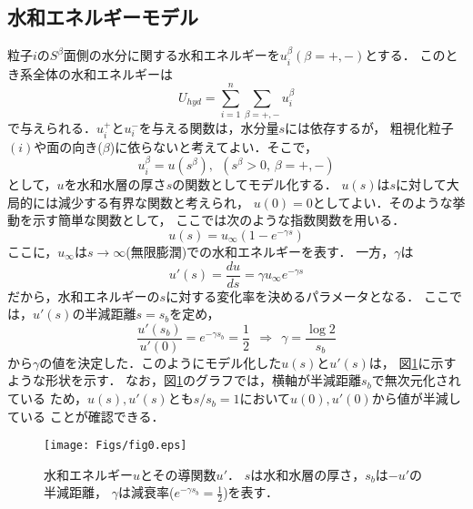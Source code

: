 \subsection{水和エネルギーモデル}
粒子$i$の$S^\beta$面側の水分に関する水和エネルギーを$u^\beta_i(\beta=+,-)$とする．
このとき系全体の水和エネルギーは
\begin{equation}
	U_{hyd}=\sum_{i=1}^n\sum_{\beta=+,-} u_i^{\beta}
	\label{eqn:}
\end{equation}
で与えられる．$u^+_i$と$u^-_i$を与える関数は，水分量$s$には依存するが，
粗視化粒子$(i)$や面の向き($\beta$)に依らないと考えてよい．そこで，
\begin{equation}
	u^\beta_i= u(s^\beta), \ \ (s^\beta>0,\, \beta=+,-)
	\label{eqn:}
\end{equation}
として，$u$を水和水層の厚さ$s$の関数としてモデル化する．
$u(s)$は$s$に対して大局的には減少する有界な関数と考えられ，
$u(0)=0$としてよい．そのような挙動を示す簡単な関数として，
ここでは次のような指数関数を用いる．
\begin{equation}
	u(s)=u_{\infty} \left(1-e^{-\gamma s} \right)
	\label{eqn:u_s}
\end{equation}
ここに，$u_{\infty}$は$s\rightarrow \infty$(無限膨潤)での水和エネルギーを表す．
一方，$\gamma$は
\begin{equation}
	u'(s)=\frac{du}{ds}=\gamma u_{\infty} e^{-\gamma s}
	\label{eqn:ud_s}
\end{equation}
だから，水和エネルギーの$s$に対する変化率を決めるパラメータとなる．
ここでは，$u'(s)$の半減距離$s=s_b$を定め，
\begin{equation}
	\frac{u'\left(s_b\right)}{u'(0)}=e^{-\gamma s_b}=\frac{1}{2} 
	\ \ \Rightarrow \ \
	\gamma=\frac{\log 2}{s_b}
	\label{eqn:}
\end{equation}
から$\gamma$の値を決定した．このようにモデル化した$u(s)$と$u'(s)$は，
図\ref{fig:fig0}に示すような形状を示す．
なお，図\ref{fig:fig0}のグラフでは，横軸が半減距離$s_b$で無次元化されている
ため，$u(s),u'(s)$とも$s/s_b=1$において$u(0),u'(0)$から値が半減している
ことが確認できる．
\begin{figure}[h]
	\begin{center}
	\texttt{[image: Figs/fig0.eps]} 
	\end{center}
	\caption{
		水和エネルギー$u$とその導関数$u'$．
		$s$は水和水層の厚さ，$s_b$は$-u'$の半減距離，
		$\gamma$は減衰率($e^{-\gamma s_b}=\frac{1}{2}$)を表す．
	} 
	\label{fig:fig0}
\end{figure}
